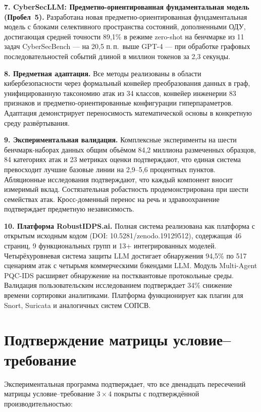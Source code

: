 \noindent\textbf{7. CyberSecLLM: Предметно-ориентированная фундаментальная модель (Пробел~5).}
Разработана новая предметно-ориентированная фундаментальная модель с блоками селективного пространства состояний, дополненными ОДУ, достигающая средней точности 89,1\% в режиме zero-shot на бенчмарке из 11 задач CyberSecBench --- на 20,5 п.\,п.\ выше GPT-4 --- при обработке графовых последовательностей событий длиной в миллион токенов за 2,3 секунды.

\noindent\textbf{8. Предметная адаптация.}
Все методы реализованы в области кибербезопасности через формальный конвейер преобразования данных в граф, унифицированную таксономию атак из 34 классов, конвейер инженерии 83 признаков и предметно-ориентированные конфигурации гиперпараметров. Адаптация демонстрирует переносимость математической основы в конкретную среду развёртывания.

\noindent\textbf{9. Экспериментальная валидация.}
Комплексные эксперименты на шести бенчмарк-наборах данных общим объёмом 84,2 миллиона размеченных образцов, 84 категориях атак и 23 метриках оценки подтверждают, что единая система превосходит лучшие базовые линии на 2,9--5,6 процентных пунктов. Абляционные исследования подтверждают, что каждый компонент вносит измеримый вклад. Состязательная робастность продемонстрирована при шести семействах атак. Кросс-доменный перенос на речь и здравоохранение подтверждает предметную независимость.

\noindent\textbf{10. Платформа RobustIDPS.ai.}
Полная система реализована как платформа с открытым исходным кодом (DOI: 10.5281/zenodo.19129512), содержащая 46 страниц, 9 функциональных групп и 13+ интегрированных моделей. Четырёхуровневая система защиты LLM достигает обнаружения 94,5\% по 517 сценариям атак с четырьмя коммерческими бэкендами LLM. Модуль Multi-Agent PQC-IDS расширяет обнаружение на постквантовые протокольные среды. Валидация пользовательским исследованием подтверждает 34\% снижение времени сортировки аналитиками. Платформа функционирует как плагин для Snort, Suricata и аналогичных систем СОПСВ.


\section*{Подтверждение матрицы условие--требование}

Экспериментальная программа подтверждает, что все двенадцать пересечений матрицы условие--требование $3\times4$ покрыты с подтверждённой производительностью:

